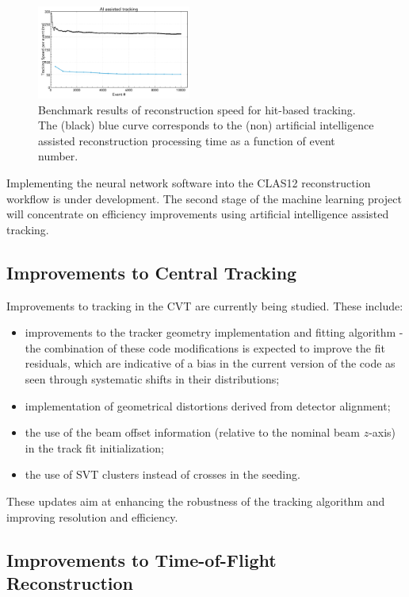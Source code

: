\begin{figure}
\centering
\includegraphics[width=0.45\textwidth]{pics/nn2.png}
\caption{Benchmark results of reconstruction speed for hit-based tracking. The (black) blue curve corresponds to
  the (non) artificial intelligence assisted reconstruction processing time as a function of event number.}
\label{fig:nn2}
\end{figure}

Implementing the neural network software into the CLAS12 reconstruction workflow is under development.
The second stage of the machine learning project will concentrate on efficiency improvements using artificial
intelligence assisted tracking.

\subsection{Improvements to Central Tracking}

Improvements to tracking in the CVT are currently being studied. These include:

\begin{itemize}
\item improvements to the tracker geometry implementation and fitting algorithm - the combination of these
  code modifications is expected to improve the fit residuals, which are indicative of a bias in the current
  version of the code as seen through systematic shifts in their distributions;
\item implementation of geometrical distortions derived from detector alignment;
\item the use of the beam offset information (relative to the nominal beam $z$-axis) in the track fit initialization;
\item the use of SVT clusters instead of crosses in the seeding.
\end{itemize}

These updates aim at enhancing the robustness of the tracking algorithm and improving resolution and efficiency.

\subsection{Improvements to Time-of-Flight Reconstruction}

